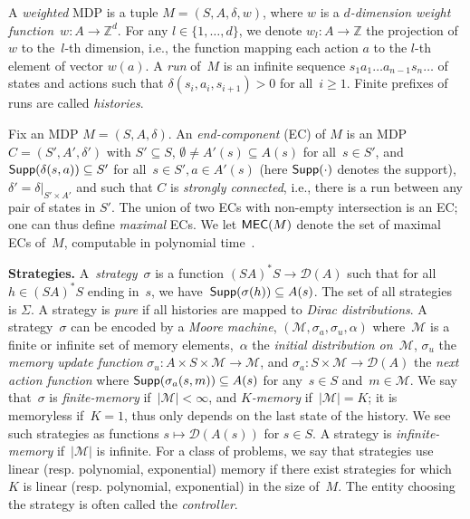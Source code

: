 \documentclass{llncs}
\newcommand{\supp}{\ensuremath{{\sf Supp}} }
\newcommand{\weight}{\ensuremath{w} }
\newcommand{\integ}{\ensuremath{\mathbb{Z}} }
\newcommand{\strats}{\ensuremath{\Sigma} }
\newcommand\calD{\ensuremath{\mathcal{D}}}
\newcommand\calM{\ensuremath{\mathcal{M}}}
\newcommand\mecs{\ensuremath{\textrm{\sf MEC}}}
\newcommand\restr[2]{\ensuremath{\left.#1\right|_{#2}}}
\begin{document}
A \textit{weighted} MDP is a tuple $M = (S,A,\delta,\weight)$, where $w$ is a \emph{$d$-dimension weight function}~$w\colon A \rightarrow \mathbb{Z}^d$.
For any $l \in \{1,\ldots,d\}$, we denote $\weight_l \colon A \rightarrow \integ$ 
the projection of~$\weight$ to the~$l$-th dimension, i.e., the function mapping each action $a$ to the $l$-th element of vector $w(a)$.
A \emph{run} of~$M$ is an infinite sequence $s_1a_1 \ldots a_{n-1}
s_n\ldots{}$ of
states and actions such that $\delta(s_i,a_i,s_{i+1})>0$ for all~$i\geq 1$.
Finite prefixes of runs are called \emph{histories}.

Fix an MDP $M = (S,A,\delta)$.
An \emph{end-component} (EC) of $M$ is
an MDP $C = (S',A',\delta')$ with $S' \subseteq S$, $\emptyset \neq A'(s) \subseteq A(s)$ for all~$s \in S'$,
and~$\supp(\delta(s,a)) \subseteq S'$ for all~$s \in S', a \in A'(s)$
(here $\supp(\cdot)$ denotes the support), $\delta' = \restr{\delta}{S'\times A'}$ and such that $C$ is \textit{strongly connected}, i.e., there is a run between any pair of states in $S'$.
The union of two ECs with non-empty intersection is
an EC; one can thus define \emph{maximal} ECs.
We let $\mecs(M)$ denote the set of maximal ECs of~$M$, computable in
polynomial time~\cite{DeAlfaro-phd97}.

\smallskip\noindent\textbf{Strategies.} A~\emph{strategy}~$\sigma$ is a function $(SA)^*S\rightarrow \calD(A)$ such that
for all~$h \in (SA)^*S$ ending in~$s$, we have~$\supp(\sigma(h)) \subseteq A(s)$. The set of all strategies is $\strats$. A strategy is \textit{pure} if all histories are mapped to \textit{Dirac distributions}. A strategy~$\sigma$ can be encoded by a 
\emph{Moore machine}, $(\calM,\sigma_a,\sigma_u,\alpha)$ 
where~$\calM$ is a finite or infinite set of memory elements,~$\alpha$ the \emph{initial
distribution on~$\calM$}, 
$\sigma_u$ the \emph{memory update
function} $\sigma_u : A\times S \times \calM \rightarrow \calM$, 
and $\sigma_a : S \times \calM \rightarrow \calD(A)$ the \emph{next action
function} where $\supp(\sigma_a(s,m)) \subseteq A(s)$ for any~$s\in S$ and~$m \in \calM$.
We say that~$\sigma$ is \emph{finite-memory} if~$|\calM|<\infty$, and \emph{$K$-memory} if~$|\calM|=K$;
it is memoryless if~$K=1$, thus only depends on the last state of the history. 
We see such strategies as functions $s \mapsto \calD(A(s))$ for $s \in S$. 
A strategy is \emph{infinite-memory} if~$|\calM|$ is infinite.
For a class of problems, we say that strategies use linear (resp. polynomial, exponential) memory 
if there exist strategies for which $K$ is linear (resp. polynomial, exponential) in the size of~$M$. The entity choosing the strategy is often called the \textit{controller}.
\end{document}
